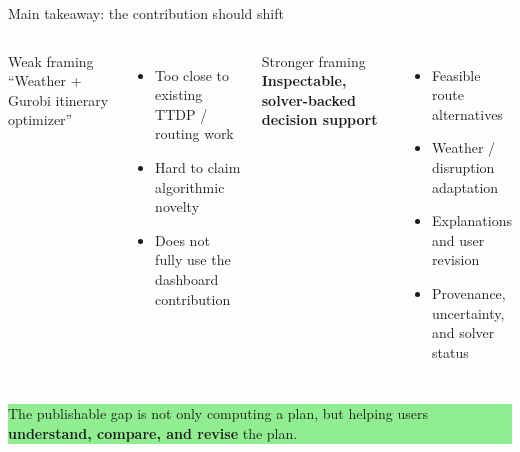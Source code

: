 \documentclass[aspectratio=169,10pt]{beamer}
\begin{document}
\begin{frame}{Main takeaway: the contribution should shift}
\begin{columns}[T,onlytextwidth]
\begin{block}{Weak framing}
\centering
\vspace{0.25em}
\Large ``Weather + Gurobi itinerary optimizer''
\vspace{0.25em}
\end{block}
\begin{itemize}
  \item Too close to existing TTDP / routing work
  \item Hard to claim algorithmic novelty
  \item Does not fully use the dashboard contribution
\end{itemize}

\begin{block}{Stronger framing}
\centering
\vspace{0.25em}
\Large \textbf{Inspectable, solver-backed decision support}
\vspace{0.25em}
\end{block}
\begin{itemize}
  \item Feasible route alternatives
  \item Weather / disruption adaptation
  \item Explanations and user revision
  \item Provenance, uncertainty, and solver status
\end{itemize}
\end{columns}

\vspace{0.6em}
\centering
\colorbox{LightGreen}{\parbox{0.86\textwidth}{\centering\small The publishable gap is not only computing a plan, but helping users \textbf{understand, compare, and revise} the plan.}}
\end{frame}
\end{document}
